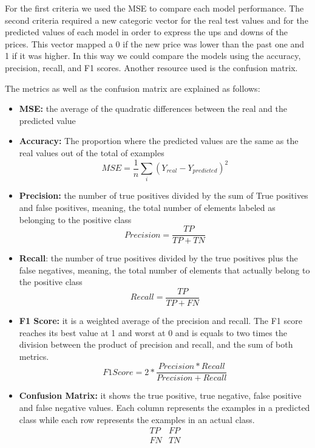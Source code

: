 For the first criteria we used the MSE to compare each model performance. The second criteria required a new categoric vector for the real test values and for the predicted values of each model in order to express the ups and downs of the prices. This vector mapped a 0 if the new price was lower than the past one and 1 if it was higher. In this way we could compare the models using the accuracy, precision, recall, and F1 scores. Another resource used is the confusion matrix. 

The metrics as well as the confusion matrix are explained as follows:

\begin{itemize}
\item \textbf{MSE:} the average of the quadratic differences between the real and the predicted value
\item \textbf{Accuracy:} The proportion where the predicted values are the same as the real values out of the total of examples
\begin{equation}
MSE=\frac{1}{n}\sum_i (Y_{real}-Y_{predicted})^2
\label{eq:msemet}
\end{equation}
\item \textbf{Precision:} the number of true positives divided by the sum of True positives and false positives, meaning, the total number of elements labeled as belonging to the positive class 
\begin{equation}
Precision=\frac{TP}{TP+TN}
\label{eq:precision}
\end{equation}
\item \textbf{Recall}: the number of true positives divided by the true positives plus the false negatives, meaning, the total number of elements that actually belong to the positive class
\begin{equation}
Recall=\frac{TP}{TP+FN}
\label{eq:recall}
\end{equation}
\item \textbf{F1 Score:} it is a weighted average of the precision and recall. The F1 score reaches its best value at 1 and worst at 0 and is equals to two times the division between the product of precision and recall, and the sum of both metrics.
\begin{equation}
F1 Score=2*\frac{Precision*Recall}{Precision+Recall}
\label{eq:fiscore}
\end{equation}
\item \textbf{Confusion Matrix:} it shows the true positive, true negative, false positive and false negative values. Each column represents the examples in a predicted class while each row represents the examples in an actual class.
$$
\begin{matrix}
TP&FP\\
FN&TN\\
\end{matrix}
$$
\end{itemize}


























